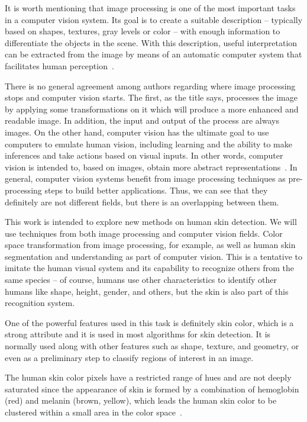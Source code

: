 It is worth mentioning that image processing is one of the most important tasks in a computer vision system. Its goal is to create a suitable description -- typically based on shapes, textures, gray levels or color -- with enough information to differentiate the objects in the scene. With this description, useful interpretation can be extracted from the image by means of an automatic computer system that facilitates human perception~\citep{gonzalez:02}.

There is no general agreement among authors regarding where image processing stops and computer vision starts. The first, as the title says, processes the image by applying some transformations on it which will produce a more enhanced and readable image. In addition, the input and output of the process are always images. On the other hand, computer vision has the ultimate goal to use computers to emulate human vision, including learning and the ability to make inferences and take actions based on visual inputs. In other words, computer vision is intended to, based on images, obtain more abstract representations~\citep{gonzalez:02}. In general,
computer vision systems benefit from image processing techniques as pre-processing steps to build better applications. Thus, we can see that they definitely are not different fields, but there is an overlapping between them.

This work is intended to explore new methods on human skin detection. We will use techniques from both image processing and computer vision fields. Color space transformation from image processing, for example, as well as human skin segmentation and understanding as part of computer vision. This is a tentative to imitate the human visual system and its capability to recognize others from the same species -- of course, humans use other characteristics to identify other humans like shape, height, gender, and others, but the skin is also part of this recognition system.

One of the powerful features used in this task is definitely skin color, which is a strong attribute and it is used in most algorithms for skin detection. It is normally used along with other features such as shape, texture, and geometry, or even as a preliminary step to classify regions of interest in an image.

The human skin color pixels have a restricted range of hues and are not deeply saturated since the appearance of skin is formed by a combination of hemoglobin (red) and melanin (brown, yellow), which leads the human skin color to be clustered within a small area in the color space~\citep{fleck:96}.

